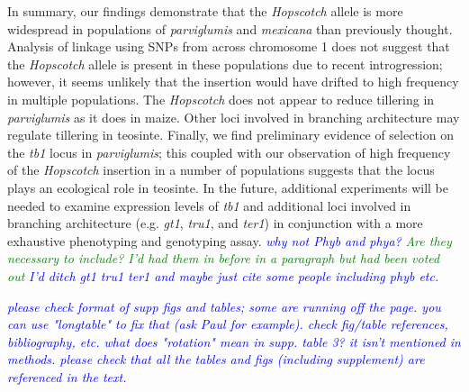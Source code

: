 \documentclass[11pt]{article}
\newcommand{\jri}[1]{\textcolor{blue}{ \emph{\scriptsize  #1}} }
\newcommand{\mbh}[1]{\textcolor{red}{ \emph{\scriptsize  #1}} }
\newcommand{\lev}[1]{\textcolor{green}{\emph{\scriptsize #1}} }
\begin{document}
\begin{linenumbers}
\begin{flushleft}
In summary, our findings demonstrate that the \emph{Hopscotch} allele is more widespread in populations of \emph{parviglumis} and \emph{mexicana} than previously thought. Analysis of linkage using SNPs from across chromosome 1 does not suggest that the \emph{Hopscotch} allele is present in these populations due to recent introgression; however, it seems unlikely that the insertion would have drifted to high frequency in multiple populations. The \emph{Hopscotch} does not appear to reduce tillering in \emph{parviglumis} as it does in maize. Other loci involved in branching architecture may regulate tillering in teosinte. Finally, we find preliminary evidence of selection on the \emph{tb1} locus in \emph{parviglumis}; this coupled with our observation of high frequency of the \emph{Hopscotch} insertion in a number of populations suggests that the locus plays an ecological role in teosinte. In the future, additional experiments will be needed to examine expression levels of \emph{tb1} and additional loci involved in branching architecture (e.g. \emph{gt1}, \emph{tru1}, and \emph{ter1}) in conjunction with a more exhaustive phenotyping and genotyping assay. \jri{why not Phyb and phya? } \lev{Are they necessary to include? I'd had them in before in a paragraph but had been voted out} \jri{I'd ditch gt1 tru1 ter1 and maybe just cite some people including phyb etc.}

\jri{please check format of supp figs and tables; some are running off the page.  you can use "longtable" to fix that (ask Paul for example). check fig/table references, bibliography, etc. what does "rotation" mean in supp. table 3? it isn't mentioned in methods. please check that all the tables and figs (including supplement) are referenced in the text.}




\end{flushleft}
\end{linenumbers}
\end{document}
